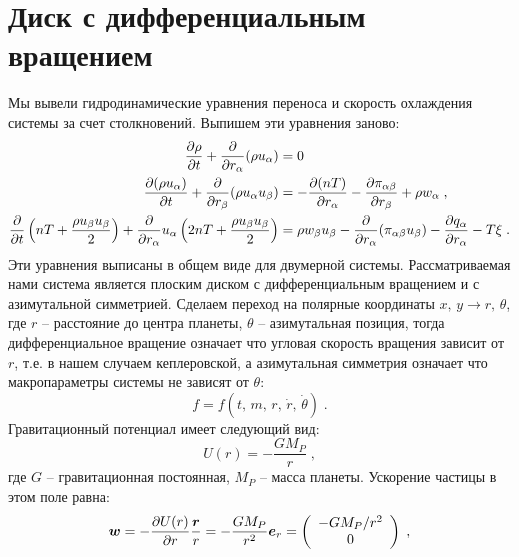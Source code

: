 \chapter{Диск с дифференциальным вращением}
\label{cha:impl}

 Мы вывели гидродинамические уравнения переноса и скорость охлаждения системы за счет столкновений.
 Выпишем эти уравнения заново:
 \begin{equation}
    \begin{split}
        \frac{\partial\rho}{\partial t}+\frac{\partial}{\partial r_{\alpha}}(\rho u_{\alpha}) &=0\;\\
        \frac{\partial(\rho u_{\alpha})}{\partial t} + \frac{\partial}{\partial r_{\beta}}(\rho u_{\alpha}u_{\beta}) 
        &= -\frac{\partial (nT)}{\partial r_{\alpha}}-\frac{\partial\pi_{\alpha\beta}}{\partial r_{\beta}}+\rho w_{\alpha}\;,\\
        \frac{\partial}{\partial t}\left(nT+\frac{\rho u_{\beta}u_{\beta}}{2}\right) + \frac{\partial}{\partial r_{\alpha}}u_{\alpha}
        \left(2nT+\frac{\rho u_{\beta}u_{\beta}}{2}\right) &= \rho w_{\beta}u_{\beta}-\frac{\partial}{\partial r_{\alpha}}(\pi_{\alpha\beta}u_{\beta})
        -\frac{\partial q_{\alpha}}{\partial r_{\alpha}}-T\xi\;.
    \end{split}
\end{equation}
Эти уравнения выписаны в общем виде для двумерной системы. Рассматриваемая нами система является плоским диском
с дифференциальным вращением и с азимутальной симметрией. 
Сделаем переход на полярные координаты $x,\,y\to r,\,\theta$, где $r$ -- расстояние до центра планеты, $\theta$ -- 
азимутальная позиция, тогда дифференциальное вращение означает что угловая скорость вращения зависит от $r$, т.е.
в нашем случаем кеплеровской, а азимутальная симметрия означает что макропараметры системы не зависят от $\theta$:
\begin{equation}
    f=f(t,\,m,\,r,\,\dot{r},\,\dot\theta)\;.
\end{equation}
Гравитационный потенциал имеет следующий вид:
\begin{equation}
    U(r) = -\frac{GM_P}{r}\;,
\end{equation}
где $G$ -- гравитационная постоянная,  $M_P$ -- масса планеты. Ускорение частицы в этом поле равна:
\begin{equation}
     \bm{w} = -\frac{\partial U(r)}{\partial r}\frac{\bm{r}}{r}=-\frac{GM_P}{r^2}\bm{e}_r = 
     \left(\begin{array}{c}
         -GM_P/r^2 \\ 0
     \end{array}\right)\;,
\end{equation}
